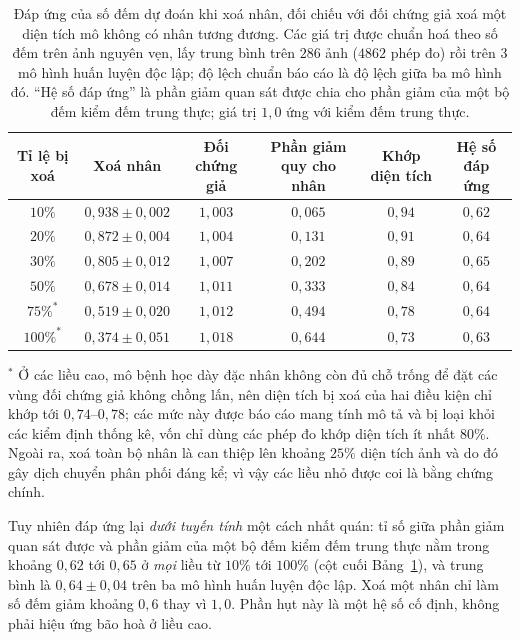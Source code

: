 \documentclass[preprint,12pt]{elsarticle}
\begin{document}
\begin{table}[!htbp]
\centering
\caption{Đáp ứng của số đếm dự đoán khi xoá nhân, đối chiếu với đối chứng giả xoá một diện tích mô không có nhân
tương đương. Các giá trị được chuẩn hoá theo số đếm trên ảnh nguyên vẹn, lấy trung bình trên $286$ ảnh ($4862$
phép đo) rồi trên $3$ mô hình huấn luyện độc lập; độ lệch chuẩn báo cáo là độ lệch giữa ba mô hình đó. ``Hệ số đáp
ứng'' là phần giảm quan sát được chia cho phần giảm của một bộ đếm kiểm đếm trung thực; giá trị $1{,}0$ ứng với
kiểm đếm trung thực.}\label{tab:doseresp}
\footnotesize
\setlength{\tabcolsep}{5pt}
\begin{tabular}{@{}cccccc@{}}
\toprule
Tỉ lệ bị xoá & Xoá nhân & Đối chứng giả & Phần giảm quy cho nhân & Khớp diện tích & Hệ số đáp ứng \\
\midrule
$10\%$  & $0{,}938\pm0{,}002$ & $1{,}003$ & $0{,}065$ & $0{,}94$ & $0{,}62$ \\
$20\%$  & $0{,}872\pm0{,}004$ & $1{,}004$ & $0{,}131$ & $0{,}91$ & $0{,}64$ \\
$30\%$  & $0{,}805\pm0{,}012$ & $1{,}007$ & $0{,}202$ & $0{,}89$ & $0{,}65$ \\
$50\%$  & $0{,}678\pm0{,}014$ & $1{,}011$ & $0{,}333$ & $0{,}84$ & $0{,}64$ \\
$75\%^{\ast}$  & $0{,}519\pm0{,}020$ & $1{,}012$ & $0{,}494$ & $0{,}78$ & $0{,}64$ \\
$100\%^{\ast}$ & $0{,}374\pm0{,}051$ & $1{,}018$ & $0{,}644$ & $0{,}73$ & $0{,}63$ \\
\bottomrule
\end{tabular}

\vspace{4pt}
\begin{minipage}{\textwidth}\footnotesize
$^{\ast}$ Ở các liều cao, mô bệnh học dày đặc nhân không còn đủ chỗ trống để đặt các vùng đối chứng giả không
chồng lấn, nên diện tích bị xoá của hai điều kiện chỉ khớp tới $0{,}74$--$0{,}78$; các mức này được báo cáo mang
tính mô tả và bị loại khỏi các kiểm định thống kê, vốn chỉ dùng các phép đo khớp diện tích ít nhất $80\%$. Ngoài
ra, xoá toàn bộ nhân là can thiệp lên khoảng $25\%$ diện tích ảnh và do đó gây dịch chuyển phân phối đáng kể; vì
vậy các liều nhỏ được coi là bằng chứng chính.
\end{minipage}
\end{table}

Tuy nhiên đáp ứng lại \emph{dưới tuyến tính} một cách nhất quán: tỉ số giữa phần giảm quan sát được và phần giảm
của một bộ đếm kiểm đếm trung thực nằm trong khoảng $0{,}62$ tới $0{,}65$ ở \emph{mọi} liều từ $10\%$ tới $100\%$
(cột cuối Bảng~\ref{tab:doseresp}), và trung bình là $0{,}64 \pm 0{,}04$ trên ba mô hình huấn luyện độc lập. Xoá
một nhân chỉ làm số đếm giảm khoảng $0{,}6$ thay vì $1{,}0$. Phần hụt này là một hệ số cố định, không phải hiệu
ứng bão hoà ở liều cao.
\end{document}
